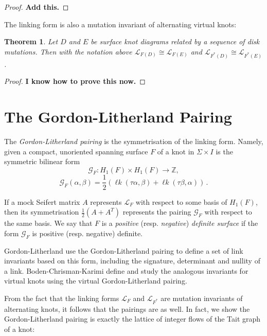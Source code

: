 \documentclass[12pt]{report}
\newcommand{\Z}{\mathbb{Z}}
\newcommand{\lk}{\operatorname{\ell\textit{k}}}
\newcommand{\notered}[1]{{\color{Red} \textbf{#1}}}
\newtheorem*{theorem}{Theorem}
\theoremstyle{upright}
\begin{document}
\begin{proof}
	\notered{Add this.}
\end{proof}

The linking form is also a mutation invariant of alternating virtual knots:

\begin{theorem}
Let $D$ and $E$ be surface knot diagrams related by a sequence of disk mutations. Then with the notation above $\mathcal{L}_{F(D)} \cong \mathcal{L}_{F(E)}$ and $\mathcal{L}_{F^{*}(D)} \cong \mathcal{L}_{F^{*}(E)}$.
\end{theorem}

\begin{proof}
\notered{I know how to prove this now.}
\end{proof}

\section{The Gordon-Litherland Pairing}

The \textit{Gordon-Litherland pairing} is the symmetrisation of the linking form. Namely, given a compact, unoriented spanning surface $F$ of a knot in $\Sigma \times I$ is the symmetric bilinear form
\[\mathcal{G}_{F}: H_{1}(F) \times H_{1}(F) \longrightarrow \Z,\]
\[\mathcal{G}_{F}(\alpha, \beta) = \dfrac{1}{2}(\lk(\tau \alpha, \beta) + \lk(\tau\beta, \alpha))\,.\]

If a mock Seifert matrix $A$ represents $\mathcal{L}_{F}$ with respect to some basis of $H_{1}(F)$, then its symmetrisation $\frac{1}{2}(A + A^{T})$ represents the pairing $\mathcal{G}_{F}$ with respect to the same basis. We say that $F$ is a \textit{positive} (resp. \textit{negative}) \textit{definite surface} if the form $\mathcal{G}_{F}$ is positive (resp. negative) definite.

Gordon-Litherland \cite{signature-of-a-link} use the Gordon-Litherland pairing to define a set of link invariants based on this form, including the signature, determinant and nullity of a link. Boden-Chrisman-Karimi \cite{gordon-litherland-pairing-thickened-surfaces} define and study the analogous invariants for virtual knots using the virtual Gordon-Litherland pairing.

From the fact that the linking forms $\mathcal{L}_{F}$ and $\mathcal{L}_{F^{*}}$ are mutation invariants of alternating knots, it follows that the pairings are as well. In fact, we show the Gordon-Litherland pairing is exactly the lattice of integer flows of the Tait graph of a knot:
\end{document}
